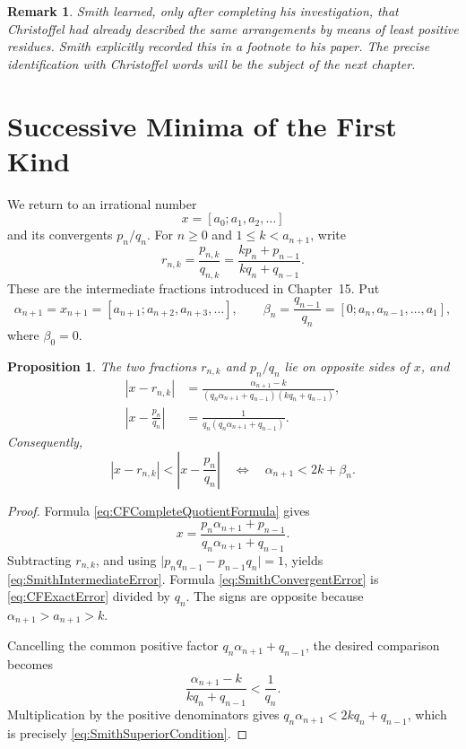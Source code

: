 \documentclass{book}
\newtheorem{proposition}[definition]{Proposition}
\newtheorem{remark}[definition]{Remark}
\begin{document}
\begin{remark}
  Smith learned, only after completing his investigation, that Christoffel
  had already described the same arrangements by means of least positive
  residues. Smith explicitly recorded this in a footnote to his paper. The
  precise identification with Christoffel words will be the subject of the
  next chapter.
\end{remark}

\section{Successive Minima of the First Kind}

We return to an irrational number
\[
  x=[a_0;a_1,a_2,\ldots]
\]
and its convergents \(p_n/q_n\). For \(n\geq0\) and
\(1\leq k<a_{n+1}\), write
\[
  r_{n,k}
  =\frac{p_{n,k}}{q_{n,k}}
  =\frac{kp_n+p_{n-1}}{kq_n+q_{n-1}}.
\]
These are the intermediate fractions introduced in Chapter~15. Put
\[
  \alpha_{n+1}=x_{n+1}
    =[a_{n+1};a_{n+2},a_{n+3},\ldots],
  \qquad
  \beta_n=\frac{q_{n-1}}{q_n}
    =[0;a_n,a_{n-1},\ldots,a_1],
\]
where \(\beta_0=0\).

\begin{proposition}\label{prop:SmithIntermediateErrors}
  The two fractions \(r_{n,k}\) and \(p_n/q_n\) lie on opposite sides of
  \(x\), and
  \begin{align}
    \left|x-r_{n,k}\right|
      &=
      \frac{\alpha_{n+1}-k}
      {(q_n\alpha_{n+1}+q_{n-1})(kq_n+q_{n-1})},
      \label{eq:SmithIntermediateError}\\
    \left|x-\frac{p_n}{q_n}\right|
      &=
      \frac{1}
      {q_n(q_n\alpha_{n+1}+q_{n-1})}.
      \label{eq:SmithConvergentError}
  \end{align}
  Consequently,
  \begin{equation}\label{eq:SmithSuperiorCondition}
    \left|x-r_{n,k}\right|
      <
    \left|x-\frac{p_n}{q_n}\right|
    \quad\Longleftrightarrow\quad
    \alpha_{n+1}<2k+\beta_n.
  \end{equation}
\end{proposition}

\begin{proof}
  Formula \eqref{eq:CFCompleteQuotientFormula} gives
  \[
    x=\frac{p_n\alpha_{n+1}+p_{n-1}}
            {q_n\alpha_{n+1}+q_{n-1}}.
  \]
  Subtracting \(r_{n,k}\), and using
  \(\lvert p_nq_{n-1}-p_{n-1}q_n\rvert=1\), yields
  \eqref{eq:SmithIntermediateError}. Formula
  \eqref{eq:SmithConvergentError} is
  \eqref{eq:CFExactError} divided by \(q_n\). The signs are opposite because
  \(\alpha_{n+1}>a_{n+1}>k\).

  Cancelling the common positive factor
  \(q_n\alpha_{n+1}+q_{n-1}\), the desired comparison becomes
  \[
    \frac{\alpha_{n+1}-k}{kq_n+q_{n-1}}
      <\frac1{q_n}.
  \]
  Multiplication by the positive denominators gives
  \(q_n\alpha_{n+1}<2kq_n+q_{n-1}\), which is precisely
  \eqref{eq:SmithSuperiorCondition}.
\end{proof}
\end{document}
